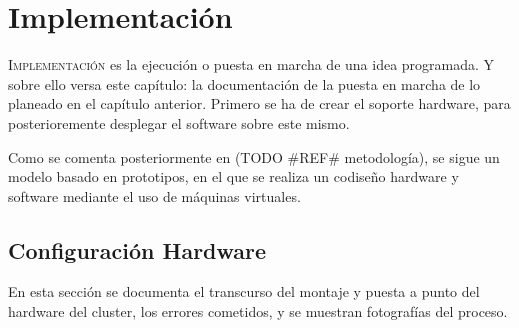 \chapter{Implementación}
\label{chap:implementacion}

\lettrine{I}{mplementación} es la ejecución o puesta en marcha de una idea programada. Y sobre ello versa este capítulo: la documentación de la puesta en marcha de lo planeado en el capítulo anterior. Primero se ha de crear el soporte hardware, para posterioremente desplegar el software sobre este mismo.

Como se comenta posteriormente en (TODO \#REF\# metodología), se sigue un modelo basado en prototipos, en el que se realiza un codiseño hardware y software mediante el uso de máquinas virtuales.

\section{Configuración Hardware}
\label{sec:configuracion_hardware}
En esta sección se documenta el transcurso del montaje y puesta a punto del hardware del cluster, los errores cometidos, y se muestran fotografías del proceso.

